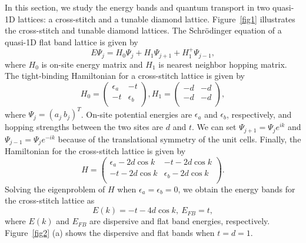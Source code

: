 \documentclass[twocolumn,showpacs,epsfig,pre]{revtex4}
\begin{document}
In this section, we study the energy bands and quantum transport in two quasi-1D lattices: a cross-stitch and a tunable diamond lattice.
Figure~\ref{fig1} illustrates the cross-stitch and tunable diamond lattices. The Schr{\"o}dinger equation of a quasi-1D flat band lattice is given by
\begin{equation}
 E \Psi_j = H_0 \Psi_j + H_1 \Psi_{j+1} + H_1^+ \Psi_{j-1},
\end{equation}
where $H_0$ is on-site energy matrix and $H_1$ is nearest neighbor hopping matrix.
The tight-binding Hamiltonian for a cross-stitch lattice is given by
\begin{equation}
 H_0 = \left(\begin{array}{cc}
 \epsilon_a & -t \\
 -t & \epsilon_b \\
\end{array}\right),
 H_1 = \left(\begin{array}{cc}
 -d & -d \\
 -d & -d \\
\end{array}\right),
\end{equation}
where $\Psi_j = (a_j ~ b_j)^T$. On-site potential energies are $\epsilon_a$ and $\epsilon_b$, respectively, and hopping strengths between the two sites are $d$ and $t$. We can set $\Psi_{j+1} = \Psi_j e^{ik}$ and $\Psi_{j-1} = \Psi_j e^{-ik}$ because of the translational symmetry of the unit cells.
Finally, the Hamiltonian for the cross-stitch lattice is given by
\begin{equation}
 H = \left(\begin{array}{cc}
 \epsilon_a - 2 d \cos{k} & -t - 2 d \cos{k} \\
 -t - 2 d \cos{k} & \epsilon_b - 2 d \cos{k} \\
\end{array}\right).
\end{equation}
Solving the eigenproblem of $H$ when $\epsilon_a = \epsilon_b = 0$, we obtain the energy bands for the cross-stitch lattice as
\begin{equation}
E(k) = -t-4 d \cos{k}, ~E_{FB}=t,
\end{equation}
where $E(k)$ and $E_{FB}$ are dispersive and flat band energies, respectively. Figure~\ref{fig2} (a) shows the dispersive and flat bands when $t=d=1$.
\end{document}
